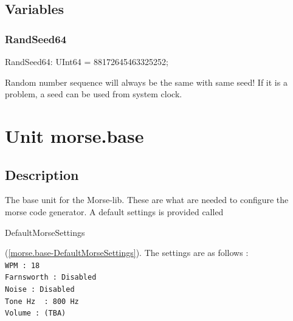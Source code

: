 \documentclass{report}
\newif\ifpdf
\begin{document}
\section{Variables}
\ifpdf
\subsection*{\large{\textbf{RandSeed64}}\normalsize\hspace{1ex}\hrulefill}
\else
\subsection*{RandSeed64}
\fi
\label{legacey.random-RandSeed64}
\begin{list}{}{
\setlength{\itemindent}{0cm}
\setlength{\listparindent}{0cm}
\setlength{\leftmargin}{\evensidemargin}
\addtolength{\leftmargin}{\tmplength}
\settowidth{\labelsep}{X}
\addtolength{\leftmargin}{\labelsep}
\setlength{\labelwidth}{\tmplength}
}
\item[\textbf{Declaration}\hfill]
\ifpdf
\begin{flushleft}
\fi
\begin{ttfamily}
RandSeed64: UInt64 = 88172645463325252;\end{ttfamily}

\ifpdf
\end{flushleft}
\fi

\par
\item[\textbf{Description}]
Random number sequence will always be the same with same seed! If it is a problem, a seed can be used from system clock.

\end{list}
\chapter{Unit morse.base}
\label{morse.base}
\section{Description}
The base unit for the Morse{-}lib. These are what are needed to configure the morse code generator. A default settings is provided called \begin{ttfamily}DefaultMorseSettings\end{ttfamily}(\ref{morse.base-DefaultMorseSettings}). The settings are as follows : \texttt{\\\nopagebreak[3]
WPM~:~18\\\nopagebreak[3]
Farnsworth~:~Disabled\\\nopagebreak[3]
Noise~:~Disabled\\\nopagebreak[3]
Tone~Hz~~:~800~Hz\\\nopagebreak[3]
Volume~:~(TBA)\\
}
\end{document}

